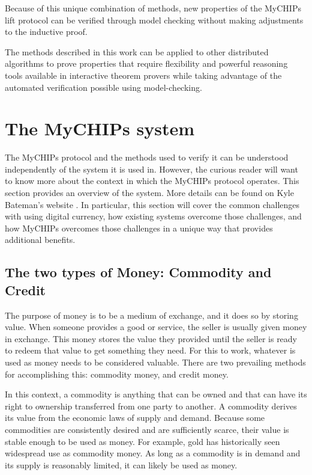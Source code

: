 \documentclass[runningheads]{llncs}
\begin{document}
Because of this unique combination of methods, new properties of the MyCHIPs lift protocol can be verified through model checking without making adjustments to the inductive proof.

The methods described in this work can be applied to other distributed algorithms to prove properties that require flexibility and powerful reasoning tools available in interactive theorem provers while taking advantage of the automated verification possible using model-checking.

\pagebreak
\appendix

\section{The MyCHIPs system}
\label{apdx:mychips}
The MyCHIPs protocol and the methods used to verify it can be understood independently of the system it is used in. However, the curious reader will want to know more about the context in which the MyCHIPs protocol operates. This section provides an overview of the system. More details can be found on Kyle Bateman's website \cite{bateman_myCHIPs}. 
In particular, this section will cover the common challenges with using digital currency, how existing systems overcome those challenges, and how MyCHIPs overcomes those challenges in a unique way that provides additional benefits. 

\subsection{The two types of Money: Commodity and Credit}
The purpose of money is to be a medium of exchange, and it does so by storing value. When someone provides a good or service, the seller is usually given money in exchange. This money stores the value they provided until the seller is ready to redeem that value to get something they need.
For this to work, whatever is used as money needs to be considered valuable. There are two prevailing methods for accomplishing this: commodity money, and credit money. 

In this context, a commodity is anything that can be owned and that can have its right to ownership transferred from one party to another. A commodity derives its value from the economic laws of supply and demand. Because some commodities are consistently desired and are sufficiently scarce, their value is stable enough to be used as money. For example, gold has historically seen widespread use as commodity money. As long as a commodity is in demand and its supply is reasonably limited, it can likely be used as money.
\end{document}
